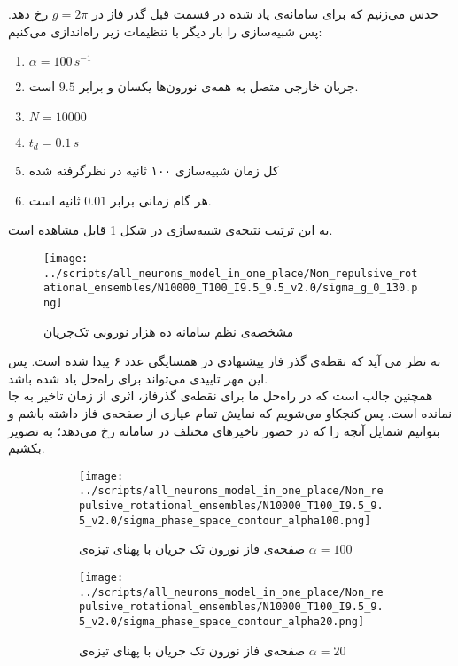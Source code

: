 حدس می‌زنیم که برای سامانه‌ی یاد شده در قسمت قبل گذر فاز در 
$g = 2\pi$
رخ دهد. پس شبیه‌سازی را بار دیگر با تنظیمات زیر راه‌اندازی می‌کنیم:

\begin{tcolorbox}[colback=green!5!white,colframe=green!75!black]
	\begin{enumerate}[*]
		\item
		$\alpha = 100\, s^{-1}$
		\item
		جریان خارجی متصل به همه‌ی نورون‌ها یکسان و برابر
		 $9.5$
		  است.
		\item
		$N = 10000$
		\item
		$t_d = 0.1\, s$ 
		\item 
		کل زمان شبیه‌سازی ۱۰۰ ثانیه در نظرگرفته شده
		\item 
		هر گام زمانی برابر $0.01$ ثانیه است.
	\end{enumerate}
\end{tcolorbox}
به این ترتیب نتیجه‌ی شبیه‌سازی در شکل 
\ref{fig:sigma_non_repulsive_single_input}
قابل مشاهده است.
\begin{figure}
	\centering
	\texttt{[image: ../scripts/all\_neurons\_model\_in\_one\_place/Non\_repulsive\_rotational\_ensembles/N10000\_T100\_I9.5\_9.5\_v2.0/sigma\_g\_0\_130.png]}
	\caption{مشخصه‌ی نظم سامانه ده هزار نورونی تک‌جریان}
	\label{fig:sigma_non_repulsive_single_input}
\end{figure}
به نظر می آید که نقطه‌ی گذر فاز پیشنهادی در همسایگی عدد ۶ پیدا شده است. پس این مهر تاییدی می‌تواند برای راه‌حل یاد شده باشد.\\
همچنین جالب است که در راه‌حل ما برای نقطه‌ی گذرفاز، اثری از زمان تاخیر به جا نمانده است. پس کنجکاو می‌شویم که نمایش تمام عیاری از صفحه‌ی فاز داشته باشم و بتوانیم شمایل آنچه را که در حضور تاخیرهای مختلف در سامانه رخ می‌دهد؛ به تصویر بکشیم.

\begin{figure}[h]
	\begin{subfigure}[b]{0.5\textwidth}
		\centering
		\texttt{[image: ../scripts/all\_neurons\_model\_in\_one\_place/Non\_repulsive\_rotational\_ensembles/N10000\_T100\_I9.5\_9.5\_v2.0/sigma\_phase\_space\_contour\_alpha100.png]}
		\caption{صفحه‌ی فاز نورون تک جریان با پهنای تیزه‌ی 
				$\alpha = 100$}
		\label{fig:non_repulsive_single_input_sigma_phase_space_alpha100}
	\end{subfigure}
	\hfill
	\begin{subfigure}[b]{0.5\textwidth}
		\centering
		\texttt{[image: ../scripts/all\_neurons\_model\_in\_one\_place/Non\_repulsive\_rotational\_ensembles/N10000\_T100\_I9.5\_9.5\_v2.0/sigma\_phase\_space\_contour\_alpha20.png]}
		\caption{صفحه‌ی فاز نورون تک جریان با پهنای تیزه‌ی 
		$\alpha = 20$}
		\label{fig:non_repulsive_single_input_sigma_phase_space_alpha20}
	\end{subfigure}
	\caption{}
	\label{fig:non_repulsive_single_input_sigma_phase_space}
\end{figure}


